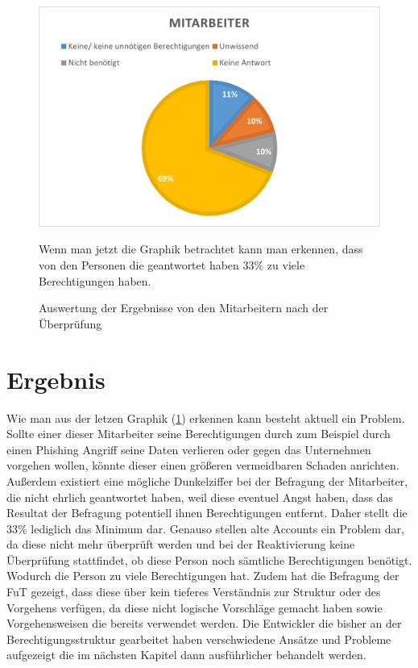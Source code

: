 \begin{figure}[h!]
 \centering
 \includegraphics[width=1\textwidth]{gfx/Picture/Mitarbeiter(korregiert).PNG}
 \caption{Auswertung der Ergebnisse von den Mitarbeitern nach der Überprüfung}
 \label{fig:MitPruf}
Wenn man jetzt die Graphik betrachtet kann man erkennen, dass von den Personen die geantwortet haben 33\% zu viele Berechtigungen haben.

\end{figure}
\section{Ergebnis}
\label{sec:Ergebnis}

Wie man aus der letzen Graphik (\ref{fig:MitPruf}) erkennen kann besteht aktuell ein Problem.
Sollte einer dieser Mitarbeiter seine Berechtigungen durch zum Beispiel durch einen Phishing Angriff seine Daten verlieren oder gegen das Unternehmen vorgehen wollen, könnte dieser einen größeren vermeidbaren Schaden anrichten.
Außerdem existiert eine mögliche Dunkelziffer bei der Befragung der Mitarbeiter, die nicht ehrlich geantwortet haben, weil diese eventuel Angst haben, dass das Resultat der Befragung potentiell ihnen Berechtigungen entfernt.
Daher stellt die 33\% lediglich das Minimum dar.
Genauso stellen alte Accounts ein Problem dar, da diese nicht mehr überprüft werden und bei der Reaktivierung keine Überprüfung stattfindet, ob diese Person noch sämtliche Berechtigungen benötigt.
Wodurch die Person zu viele Berechtigungen hat.
Zudem hat die Befragung der \ac{FuT} gezeigt, dass diese über kein tieferes Verständnis zur Struktur oder des Vorgehens verfügen, da diese nicht logische Vorschläge gemacht haben sowie Vorgehensweisen die bereits verwendet werden.
Die Entwickler die bisher an der Berechtigungsstruktur gearbeitet haben verschwiedene Ansätze und Probleme aufgezeigt die im nächsten Kapitel dann ausführlicher behandelt werden.